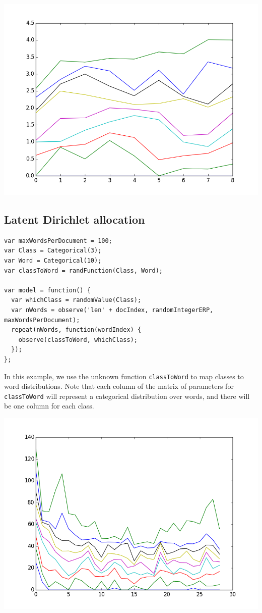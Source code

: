 \documentclass{article}
\begin{document}
\begin{center}
  \includegraphics[scale=0.5]{../plots/accuracy_hmm.png}
\end{center}

\subsection{Latent Dirichlet allocation}
{\small
\begin{lstlisting}
var maxWordsPerDocument = 100;
var Class = Categorical(3);
var Word = Categorical(10);
var classToWord = randFunction(Class, Word);

var model = function() {
  var whichClass = randomValue(Class);
  var nWords = observe('len' + docIndex, randomIntegerERP, maxWordsPerDocument);
  repeat(nWords, function(wordIndex) {
    observe(classToWord, whichClass);
  });
};
\end{lstlisting}
}

In this example, we use the unknown function \texttt{classToWord} to map classes to word distributions.  Note that each column of the matrix of parameters for \texttt{classToWord} will represent a categorical distribution over words, and there will be one column for each class.

\begin{center}
  \includegraphics[scale=0.5]{../plots/accuracy_lda.png}
\end{center}
\end{document}
